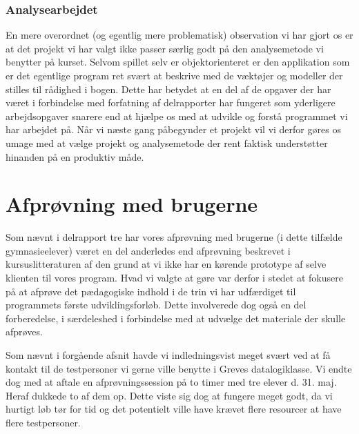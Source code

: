 \documentclass[10pt,a4paper,danish]{article}
\begin{document}
\subsubsection{Analysearbejdet}
En mere overordnet (og egentlig mere problematisk) observation vi har gjort os er at det projekt vi 
har valgt ikke passer særlig godt på den analysemetode vi benytter på kurset. Selvom spillet selv 
er objektorienteret er den applikation som er det egentlige program ret svært at beskrive med de 
væktøjer og modeller der stilles til rådighed i bogen. Dette har betydet at en del af de opgaver der
har været i forbindelse med forfatning af delrapporter har fungeret som yderligere arbejdsopgaver
snarere end at hjælpe os med at udvikle og forstå programmet vi har arbejdet på. Når vi næste gang
påbegynder et projekt vil vi derfor gøres os umage med at vælge projekt og analysemetode der rent 
faktisk understøtter hinanden på en produktiv måde. 

\section{Afprøvning med brugerne}
Som nævnt i delrapport tre har vores afprøvning med brugerne (i dette tilfælde gymnasieelever)
været en del anderledes end afprøvning beskrevet i kursuslitteraturen af den grund at vi ikke 
har en kørende prototype af selve klienten til vores program. Hvad vi valgte at gøre var 
derfor i stedet at fokusere på at afprøve det pædagogiske indhold i de trin vi har udfærdiget
til programmets første udviklingsforløb. Dette involverede dog også en del forberedelse, i 
særdeleshed i forbindelse med at udvælge det materiale der skulle afprøves. 

Som nævnt i forgående afsnit havde vi indledningsvist meget svært ved at få kontakt til de 
testpersoner vi gerne ville benytte i Greves datalogiklasse. Vi endte dog med at aftale en 
afprøvningssession på to timer med tre elever d. 31. maj. Heraf dukkede to af dem op. Dette viste sig dog
at fungere meget godt, da vi hurtigt løb tør for tid og det potentielt ville have krævet flere resourcer
at have flere testpersoner.
\end{document}
